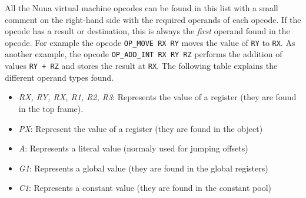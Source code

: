 All the Nuua virtual machine opcodes can be found in this list with a small comment on the right-hand side with the required operands of each
opcode. If the opcode has a result or destination, this is always the \emph{first} operand found in the opcode. For example the opcode
\texttt{OP\_MOVE RX RY} moves the value of \texttt{RY} to \texttt{RX}. As another example, the opcode \texttt{OP\_ADD\_INT RX RY RZ} performs
the addition of values \texttt{RY + RZ} and stores the result at \texttt{RX}. The following table explains the different operand types found.

\begin{itemize}
    \item \emph{RX, RY, RX, R1, R2, R3}: Represents the value of a register (they are found in the top frame).
    \item \emph{PX}: Represent the value of a register (they are found in the object)
    \item \emph{A}: Represents a literal value (normaly used for jumping offsets)
    \item \emph{G1}: Represents a global value (they are found in the global registers)
    \item \emph{C1}: Represents a constant value (they are found in the constant pool)\\
\end{itemize}

